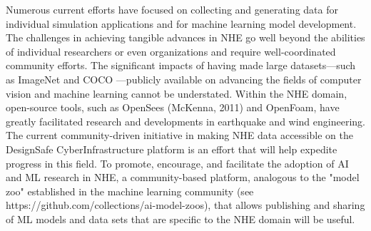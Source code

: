 Numerous current efforts have focused on collecting and generating data for individual simulation applications and for machine learning model development. The challenges in achieving tangible advances in NHE go well beyond the abilities of individual researchers or even organizations and require well-coordinated community efforts. The significant impacts of having made large datasets—such as ImageNet \citep{deng2009imagenet} and COCO \citep{lin2014microsoft}—publicly available on advancing the fields of computer vision and machine learning cannot be understated. Within the NHE domain, open-source tools, such as OpenSees (McKenna, 2011) and OpenFoam\citep{chen2014}, have greatly facilitated research and developments in earthquake and wind engineering. The current community-driven initiative in making NHE data accessible on the DesignSafe CyberInfrastructure platform is an effort that will help expedite progress in this field\citep{rathje2017}. To promote, encourage, and facilitate the adoption of AI and ML research in NHE, a community-based platform, analogous to the "model zoo" established in the machine learning community (see https://github.com/collections/ai-model-zoos), that allows publishing and sharing of ML models and data sets that are specific to the NHE domain will be useful. 

